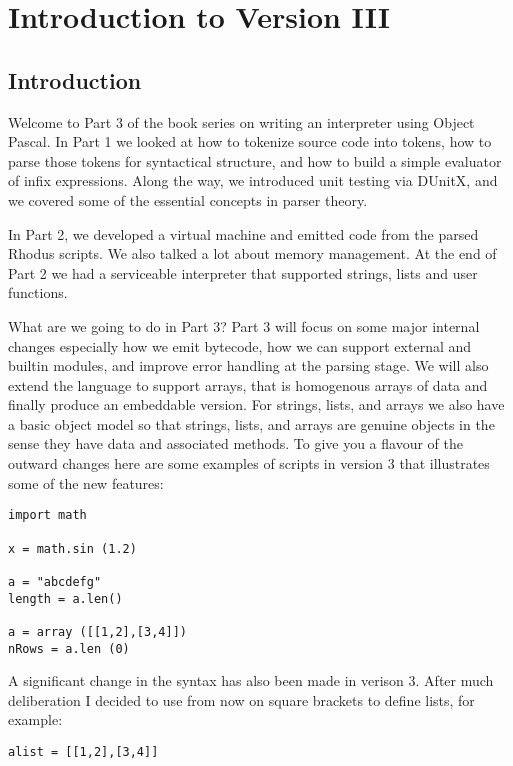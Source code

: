 {\bfseries\sffamily\huge\color{ChapterTitleColor} \chapter{Introduction to Version III}} \label{chap:interpreters }

\section{Introduction}

Welcome to Part 3 of the book series on writing an interpreter using Object Pascal. In Part 1 we looked at how to tokenize source code into tokens, how to parse those tokens for syntactical structure, and how to build a simple evaluator of infix expressions. Along the way, we introduced unit testing via DUnitX, and we covered some of the essential concepts in parser theory.

In Part 2, we developed a virtual machine and emitted code from the parsed Rhodus scripts. We also talked a lot about memory management. At the end of Part 2 we had a serviceable interpreter that supported strings, lists and user functions.

What are we going to do in Part 3? Part 3 will focus on some major internal changes especially how we emit bytecode, how we can support external and builtin modules, and improve error handling at the parsing stage. We will also extend the language to support arrays, that is homogenous arrays of data and finally produce an embeddable version. For strings, lists, and arrays we also have a basic object model so that strings, lists, and arrays are genuine objects in the sense they have data and associated methods. To give you a flavour of the outward changes here are some examples of scripts in version 3 that illustrates some of the new features:

\begin{lstlisting}
import math

x = math.sin (1.2)

a = "abcdefg"
length = a.len()

a = array ([[1,2],[3,4]])
nRows = a.len (0)
\end{lstlisting}

A significant change in the syntax has also been made in verison 3. After much deliberation I decided to use from now on square brackets to define lists, for example:

\begin{lstlisting}
alist = [[1,2],[3,4]]
\end{lstlisting}

